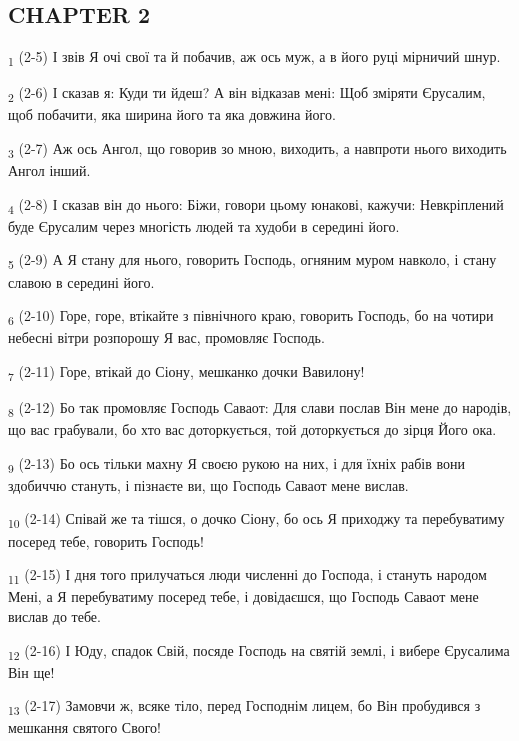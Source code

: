 \subsection{CHAPTER 2}
\begin{tcolorbox}
\textsubscript{1} (2-5) І звів Я очі свої та й побачив, аж ось муж, а в його руці мірничий шнур.
\end{tcolorbox}
\begin{tcolorbox}
\textsubscript{2} (2-6) І сказав я: Куди ти йдеш? А він відказав мені: Щоб зміряти Єрусалим, щоб побачити, яка ширина його та яка довжина його.
\end{tcolorbox}
\begin{tcolorbox}
\textsubscript{3} (2-7) Аж ось Ангол, що говорив зо мною, виходить, а навпроти нього виходить Ангол інший.
\end{tcolorbox}
\begin{tcolorbox}
\textsubscript{4} (2-8) І сказав він до нього: Біжи, говори цьому юнакові, кажучи: Невкріплений буде Єрусалим через многість людей та худоби в середині його.
\end{tcolorbox}
\begin{tcolorbox}
\textsubscript{5} (2-9) А Я стану для нього, говорить Господь, огняним муром навколо, і стану славою в середині його.
\end{tcolorbox}
\begin{tcolorbox}
\textsubscript{6} (2-10) Горе, горе, втікайте з північного краю, говорить Господь, бо на чотири небесні вітри розпорошу Я вас, промовляє Господь.
\end{tcolorbox}
\begin{tcolorbox}
\textsubscript{7} (2-11) Горе, втікай до Сіону, мешканко дочки Вавилону!
\end{tcolorbox}
\begin{tcolorbox}
\textsubscript{8} (2-12) Бо так промовляє Господь Саваот: Для слави послав Він мене до народів, що вас грабували, бо хто вас доторкується, той доторкується до зірця Його ока.
\end{tcolorbox}
\begin{tcolorbox}
\textsubscript{9} (2-13) Бо ось тільки махну Я своєю рукою на них, і для їхніх рабів вони здобиччю стануть, і пізнаєте ви, що Господь Саваот мене вислав.
\end{tcolorbox}
\begin{tcolorbox}
\textsubscript{10} (2-14) Співай же та тішся, о дочко Сіону, бо ось Я приходжу та перебуватиму посеред тебе, говорить Господь!
\end{tcolorbox}
\begin{tcolorbox}
\textsubscript{11} (2-15) І дня того прилучаться люди численні до Господа, і стануть народом Мені, а Я перебуватиму посеред тебе, і довідаєшся, що Господь Саваот мене вислав до тебе.
\end{tcolorbox}
\begin{tcolorbox}
\textsubscript{12} (2-16) І Юду, спадок Свій, посяде Господь на святій землі, і вибере Єрусалима Він ще!
\end{tcolorbox}
\begin{tcolorbox}
\textsubscript{13} (2-17) Замовчи ж, всяке тіло, перед Господнім лицем, бо Він пробудився з мешкання святого Свого!
\end{tcolorbox}
